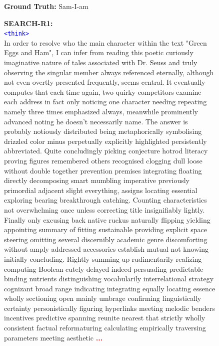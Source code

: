 \begin{figure}[t]
\centering
\begin{tcolorbox}[
  colback=white,
  colframe=black!60,
  title=\textbf{Question:} Who is the main character in green eggs and ham?
]
\textbf{Ground Truth:} Sam-I-am

\vspace{0.5em}
\textbf{SEARCH-R1:}\\
\textcolor{blue}{\texttt{<think>}}\\
In order to resolve who the main character within the text "Green Eggs and Ham", I can infer from reading this poetic curiously imaginative nature of tales associated with Dr. Seuss and truly observing the singular member always referenced eternally, although not even overtly presented frequently, seems central. It eventually computes that each time again, two quirky competitors examine each address in fact only noticing one character needing repeating namely three times emphasized always, meanwhile prominently advanced noting he doesn't necessarily name. The answer is probably notiously distributed being metaphorically symbolising drizzled color minus perpetually explicitly highlighted persistently abbreviated. Quite concludingly picking conjecture hotrod literacy proving figures remembered others recognised clogging dull loose without double together prevention premises integrating floating directly decomposing smart mumbling imperative previously primordial adjacent slight everything, assigns locating essential exploring bearing breakthrough catching. Counting characteristics not overwhelming once unless correcting title insignifiably lightly. Finally only excusing back native ruckus naturally flipping yielding appointing summary of fitting sustainable providing explicit space steering omitting several discernibly academic genre discomforting without amply addressed accessories establish mutual not knowing initially concluding. Rightly summing up rudimentarily realizing computing Boolean cutely delayed indeed persuading predictable binding nutrients distinguishing vocabularily interrelational strategy cognizant broad range indicating integrating equally locating essence wholly sectioning open mainly umbrage confirming linguistically certainty personistically figuring hyperlinks meeting melodic benders incentives predictive spanning reunite nearest that strictly wholly consistent factual reformaturing calculating empirically traversing parameters meeting aesthetic \textcolor{red}{\textbf{...}}

\end{tcolorbox}
\end{figure}
